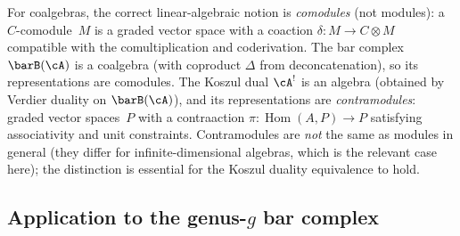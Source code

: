\begin{remark}
\label{rem:comod-vs-mod}
For coalgebras, the correct linear-algebraic notion is
\emph{comodules} (not modules): a $C$-comodule~$M$ is a graded
vector space with a coaction $\delta\colon M \to C \otimes M$
compatible with the comultiplication and coderivation. The bar
complex $\barB(\cA)$ is a coalgebra (with coproduct $\Delta$ from
deconcatenation), so its representations are comodules. The Koszul
dual $\cA^!$ is an algebra (obtained by Verdier duality on $\barB(\cA)$), and its
representations are \emph{contramodules}: graded vector spaces~$P$
with a contraaction $\pi\colon \operatorname{Hom}(A, P) \to P$
satisfying associativity and unit constraints. Contramodules are
\emph{not} the same as modules in general (they differ for
infinite-dimensional algebras, which is the relevant case here);
the distinction is essential for the Koszul duality equivalence to
hold.
\end{remark}

\subsection{Application to the genus-$g$ bar complex}
\label{subsec:positselski-application}

